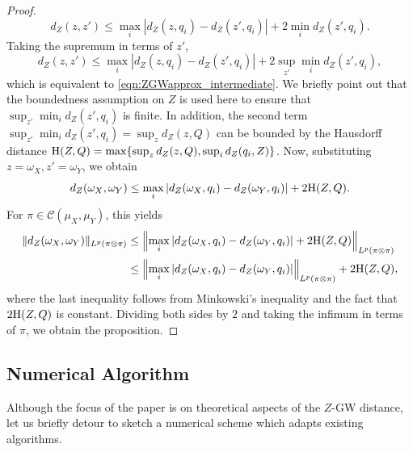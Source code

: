 \documentclass[twoside,11pt]{article}
\theoremstyle{definition}
\begin{document}
\begin{proof}
\begin{equation}
        d_Z(z,z') \leq \max_{i}|d_Z(z, q_i)-d_Z(z',q_i)| + 2\min_{i}d_Z(z',q_i).
    \end{equation}
    Taking the supremum in terms of $z'$,
    \begin{equation}
        d_Z(z,z') \leq \max_{i}|d_Z(z, q_i)-d_Z(z',q_i)| + 2\sup_{z'}\min_{i}d_Z(z',q_i),
    \end{equation}
    which is equivalent to \eqref{eqn:ZGWapprox_intermediate}.
    We briefly point out that the boundedness assumption on $Z$ is used here to ensure that $\sup_{z'}\min_{i}d_Z(z',q_i)$  is finite. In addition, the second term $\sup_{z'}\min_{i}d_Z(z',q_i)=\sup_{z}d_Z(z,Q)$ can be bounded by the Hausdorff distance $\textnormal{H}(Z,Q)=\max\{\sup_{z}d_Z(z,Q), \sup_{i}d_Z(q_i,Z)\}$. Now, substituting $z=\omega_X, z'=\omega_Y$, we obtain
    \begin{equation}
        d_Z(\omega_X,\omega_Y) \leq \max_{i}|d_Z(\omega_X, q_i)-d_Z(\omega_Y,q_i)| + 2\textnormal{H}(Z,Q).
    \end{equation}
    For $\pi \in \mathcal{C}(\mu_X,\mu_Y)$, this yields
    \begin{align}
        \|d_Z(\omega_X,\omega_Y)\|_{L^p(\pi\otimes \pi)} & \leq \left\|\max_{i}|d_Z(\omega_X, q_i)-d_Z(\omega_Y,q_i)|+ 2\mathrm{H}(Z,Q)\right\|_{L^p(\pi\otimes \pi)} \\
                                                       & \leq \left\|\max_{i}|d_Z(\omega_X, q_i)-d_Z(\omega_Y,q_i)|\right\|_{L^p(\pi\otimes \pi)} +2\textnormal{H}(Z,Q),
    \end{align}
    where the last inequality follows from Minkowski's inequality and the fact that $2\textnormal{H}(Z,Q)$ is constant.
    Dividing both sides by $2$ and taking the infimum in terms of $\pi$, we obtain the proposition.
\end{proof}

\subsection{Numerical Algorithm}\label{sec:algorithm}
Although the focus of the paper is on theoretical aspects of the $Z$-GW distance, let us briefly detour to sketch a numerical scheme which adapts existing algorithms. 
\end{document}
